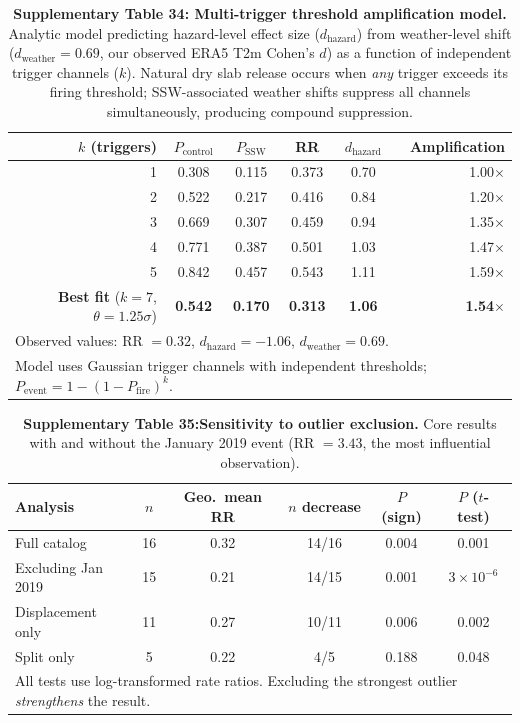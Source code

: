 \documentclass[11pt,letterpaper]{article}
\begin{document}
\begin{table}[h!]
\centering
\caption{\textbf{Supplementary Table 34: Multi-trigger threshold amplification model.} Analytic model predicting hazard-level effect size ($d_{\mathrm{hazard}}$) from weather-level shift ($d_{\mathrm{weather}} = 0.69$, our observed ERA5 T2m Cohen's $d$) as a function of independent trigger channels ($k$). Natural dry slab release occurs when \emph{any} trigger exceeds its firing threshold; SSW-associated weather shifts suppress all channels simultaneously, producing compound suppression.}
\label{tab:threshold_amp}
\begin{tabular}{rccccr}
\toprule
$k$ (triggers) & $P_{\mathrm{control}}$ & $P_{\mathrm{SSW}}$ & RR & $d_{\mathrm{hazard}}$ & Amplification \\
\midrule
1 & 0.308 & 0.115 & 0.373 & 0.70 & 1.00$\times$ \\
2 & 0.522 & 0.217 & 0.416 & 0.84 & 1.20$\times$ \\
3 & 0.669 & 0.307 & 0.459 & 0.94 & 1.35$\times$ \\
4 & 0.771 & 0.387 & 0.501 & 1.03 & 1.47$\times$ \\
5 & 0.842 & 0.457 & 0.543 & 1.11 & 1.59$\times$ \\
\midrule
\textbf{Best fit} ($k = 7$, $\theta = 1.25\sigma$) & \textbf{0.542} & \textbf{0.170} & \textbf{0.313} & \textbf{1.06} & \textbf{1.54$\times$} \\
\bottomrule
\multicolumn{6}{l}{\footnotesize Observed values: RR $= 0.32$, $d_{\mathrm{hazard}} = -1.06$, $d_{\mathrm{weather}} = 0.69$.} \\
\multicolumn{6}{l}{\footnotesize Model uses Gaussian trigger channels with independent thresholds; $P_{\mathrm{event}} = 1 - (1 - P_{\mathrm{fire}})^k$.} \\
\end{tabular}
\end{table}

\begin{table}[h!]
\centering
\caption{\textbf{Supplementary Table 35:Sensitivity to outlier exclusion.} Core results with and without the January 2019 event (RR $= 3.43$, the most influential observation).}
\label{tab:outlier_sens}
\begin{tabular}{lccccc}
\toprule
Analysis & $n$ & Geo.\ mean RR & $n$ decrease & $P$ (sign) & $P$ ($t$-test) \\
\midrule
Full catalog & 16 & 0.32 & 14/16 & 0.004 & 0.001 \\
Excluding Jan 2019 & 15 & 0.21 & 14/15 & 0.001 & $3 \times 10^{-6}$ \\
Displacement only & 11 & 0.27 & 10/11 & 0.006 & 0.002 \\
Split only & 5 & 0.22 & 4/5 & 0.188 & 0.048 \\
\bottomrule
\multicolumn{6}{l}{\footnotesize All tests use log-transformed rate ratios. Excluding the strongest outlier \emph{strengthens} the result.} \\
\end{tabular}
\end{table}
\end{document}
